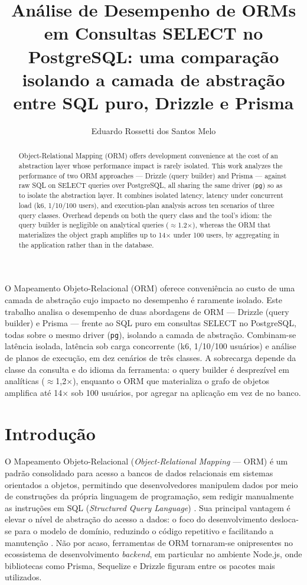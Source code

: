 \documentclass[12pt]{article}
\title{Análise de Desempenho de ORMs em Consultas SELECT no
  PostgreSQL: uma comparação isolando a camada de abstração entre SQL
  puro, Drizzle e Prisma}
\author{Eduardo Rossetti dos Santos Melo\inst{1}}
\begin{document}
\maketitle

\begin{abstract}
  Object-Relational Mapping (ORM) offers development convenience at the
  cost of an abstraction layer whose performance impact is rarely
  isolated. This work analyzes the performance of two ORM approaches ---
  Drizzle (query builder) and Prisma --- against raw SQL on SELECT
  queries over PostgreSQL, all sharing the same driver (\texttt{pg}) so
  as to isolate the abstraction layer. It combines isolated latency,
  latency under concurrent load (k6, 1/10/100 users), and execution-plan
  analysis across ten scenarios of three query classes. Overhead depends
  on both the query class and the tool's idiom: the query builder is
  negligible on analytical queries ($\approx$1.2$\times$), whereas the
  ORM that materializes the object graph amplifies up to 14$\times$ under
  100 users, by aggregating in the application rather than in the
  database.
\end{abstract}

\begin{resumo}
  O Mapeamento Objeto-Relacional (ORM) oferece conveniência ao custo de
  uma camada de abstração cujo impacto no desempenho é raramente
  isolado. Este trabalho analisa o desempenho de duas abordagens de ORM
  --- Drizzle (query builder) e Prisma --- frente ao SQL puro em
  consultas SELECT no PostgreSQL, todas sobre o mesmo driver
  (\texttt{pg}), isolando a camada de abstração. Combinam-se latência
  isolada, latência sob carga concorrente (k6, 1/10/100 usuários) e
  análise de planos de execução, em dez cenários de três classes. A
  sobrecarga depende da classe da consulta e do idioma da ferramenta: o
  query builder é desprezível em analíticas ($\approx$1,2$\times$),
  enquanto o ORM que materializa o grafo de objetos amplifica até
  14$\times$ sob 100 usuários, por agregar na aplicação em vez de no
  banco.
\end{resumo}

\section{Introdução}

O Mapeamento Objeto-Relacional (\textit{Object-Relational Mapping} ---
ORM) é um padrão consolidado para acesso a bancos de dados relacionais
em sistemas orientados a objetos, permitindo que desenvolvedores
manipulem dados por meio de construções da própria linguagem de
programação, sem redigir manualmente as instruções em SQL
(\textit{Structured Query Language}) \cite{nicoletti2024}. Sua principal
vantagem é elevar o nível de abstração do acesso a dados: o foco do
desenvolvimento desloca-se para o modelo de domínio, reduzindo o código
repetitivo e facilitando a manutenção \cite{oliveira2024}. Não por
acaso, ferramentas de ORM tornaram-se onipresentes no ecossistema de
desenvolvimento \textit{backend}, em particular no ambiente Node.js,
onde bibliotecas como Prisma, Sequelize e Drizzle figuram entre os
pacotes mais utilizados.
\end{document}
